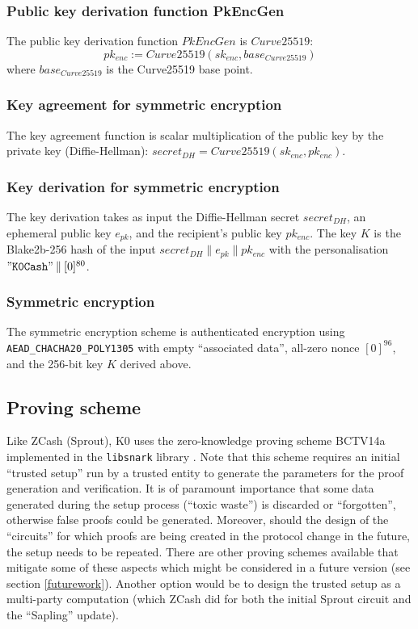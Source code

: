 \documentclass{article}
\newcommand{\conc}{\mathbin{\|}}
\begin{document}
\subsubsection{Public key derivation function PkEncGen}
The public key derivation function $PkEncGen$ is $Curve25519$:
$$pk_{enc} := Curve25519(sk_{enc}, base_{Curve25519})$$
where $base_{Curve25519}$ is the Curve25519 base point.

\subsubsection{Key agreement for symmetric encryption}
The key agreement function is scalar multiplication of the public key by the private key (Diffie-Hellman):
$secret_{DH} = Curve25519(sk_{enc}, pk_{enc})$.

\subsubsection{Key derivation for symmetric encryption}
The key derivation takes as input the Diffie-Hellman secret $secret_{DH}$, an ephemeral public key $e_{pk}$, and the recipient's public key $pk_{enc}$. The key $K$ is the  Blake2b-256 hash of the input $secret_{DH} \conc e_{pk} \conc pk_{enc}$ with the personalisation $\mathtt{"K0Cash"} \conc [0]^{80}$.

\subsubsection{Symmetric encryption}
The symmetric encryption scheme is authenticated encryption using \texttt{AEAD\_CHACHA20\_POLY1305} with empty ``associated data'', all-zero nonce $[0]^{96}$, and the 256-bit key $K$ derived above.

\subsection{Proving scheme}
Like ZCash (Sprout), K0 uses the zero-knowledge proving scheme BCTV14a \cite{bctv14a} implemented in the \texttt{libsnark} library \cite{libsnark}. Note that this scheme requires an initial ``trusted setup'' run by a trusted entity to generate the parameters for the proof generation and verification. It is of paramount importance that some data generated during the setup process (``toxic waste'') is discarded or ``forgotten'', otherwise false proofs could be generated. Moreover, should the design of the ``circuits'' for which proofs are being created in the protocol change in the future, the setup needs to be repeated. There are other proving schemes available that mitigate some of these aspects which might be considered in a future version (see section \ref{futurework}). Another option would be to design the trusted setup as a multi-party computation (which ZCash did for both the initial Sprout circuit and the ``Sapling'' update).
\end{document}
